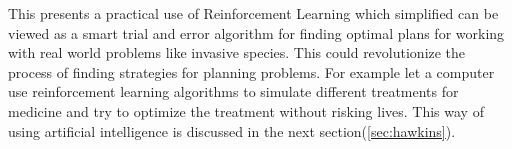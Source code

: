 
This presents a practical use of Reinforcement Learning which simplified can be viewed as a smart trial and error algorithm for finding optimal plans for working with real world problems like invasive species. This could revolutionize the process of finding strategies for planning problems. For example let a computer use reinforcement learning algorithms to simulate different treatments for medicine and try to optimize the treatment without risking lives. This way of using artificial intelligence is discussed in the next section(\ref{sec:hawkins}).


